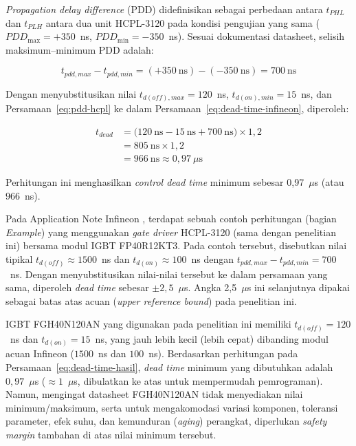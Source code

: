 \emph{Propagation delay difference} (PDD) didefinisikan sebagai
perbedaan antara $t_{PHL}$ dan $t_{PLH}$ antara dua unit
HCPL-3120 pada kondisi pengujian yang sama
($PDD_{\max} = +350$~ns, $PDD_{\min} = -350$~ns). Sesuai
dokumentasi datasheet, selisih maksimum--minimum PDD adalah:

\begin{equation}
  t_{pdd,max} - t_{pdd,min} = (+350~\text{ns}) - (-350~\text{ns}) = 700~\text{ns}
  \label{eq:pdd-hcpl}
\end{equation}

Dengan menyubstitusikan nilai $t_{d(off),max} = 120$~ns,
$t_{d(on),min} = 15$~ns, dan Persamaan~\eqref{eq:pdd-hcpl} ke
dalam Persamaan~\eqref{eq:dead-time-infineon}, diperoleh:

\begin{equation}
  \begin{aligned}
    t_{dead} &= \bigl( 120~\text{ns} - 15~\text{ns} + 700~\text{ns} \bigr) \times 1{,}2 \\
             &= 805~\text{ns} \times 1{,}2 \\
             &= 966~\text{ns} \approx 0{,}97~\mu\text{s}
  \end{aligned}
  \label{eq:dead-time-hasil}
\end{equation}

Perhitungan ini menghasilkan \emph{control dead time} minimum
sebesar 0{,}97~$\mu$s (atau $966$~ns).

Pada Application Note Infineon \parencite{infineon_deadtime2021}, terdapat sebuah
contoh perhitungan (bagian \emph{Example}) yang menggunakan
\emph{gate driver} HCPL-3120 (sama dengan penelitian ini) bersama
modul IGBT FP40R12KT3. Pada contoh tersebut, disebutkan
nilai tipikal $t_{d(off)} \approx 1500$~ns dan
$t_{d(on)} \approx 100$~ns dengan $t_{pdd,max} - t_{pdd,min} =
700$~ns. Dengan menyubstitusikan nilai-nilai tersebut ke dalam
persamaan yang sama, diperoleh \emph{dead time} sebesar
$\pm 2{,}5$~$\mu$s. Angka 2{,}5~$\mu$s ini selanjutnya dipakai
sebagai batas atas acuan (\emph{upper reference bound}) pada
penelitian ini.

IGBT FGH40N120AN yang digunakan pada penelitian ini memiliki
$t_{d(off)} = 120$~ns dan $t_{d(on)} = 15$~ns, yang jauh lebih
kecil (lebih cepat) dibanding modul acuan Infineon
($1500$~ns dan $100$~ns). Berdasarkan perhitungan pada
Persamaan~\eqref{eq:dead-time-hasil}, \emph{dead time} minimum
yang dibutuhkan adalah $0{,}97$~$\mu$s ($\approx 1$~$\mu$s,
dibulatkan ke atas untuk mempermudah pemrograman). Namun,
mengingat datasheet FGH40N120AN tidak menyediakan nilai
minimum/maksimum, serta untuk mengakomodasi variasi komponen,
toleransi parameter, efek suhu, dan kemunduran
(\emph{aging}) perangkat, diperlukan \emph{safety margin} tambahan
di atas nilai minimum tersebut.


